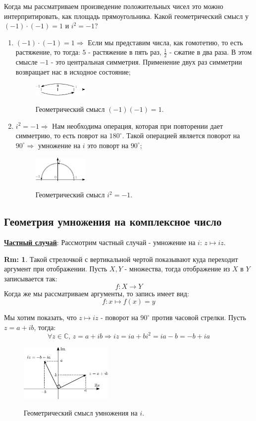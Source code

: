 \documentclass[12pt]{article}
\newcommand{\MC}{\mathbb{C}}
\theoremstyle{definition}
\newtheorem{rem}{Rm:}
\begin{document}
Когда мы рассматриваем произведение положительных чисел это можно интерпритировать, как площадь прямоугольника. Какой геометрический смысл у $(-1){\cdot}(-1) = 1$ и $i^2 = -1$? 
\begin{enumerate}[label=(\arabic*)]
	\item $(-1){\cdot}(-1) = 1 \Rightarrow$ Если мы представим числа, как гомотетию, то есть растяжение, то тогда: $5$ - растяжение в пять раз, $\tfrac{1}{2}$ - сжатие в два раза. В этом смысле $-1$ - это центральная симметрия. Применение двух раз симметрии возвращает нас в исходное состояние;
	\begin{figure}[H]
		\centering
		\includegraphics[width=0.25\textwidth]{AL1S2_6.eps}
		\label{2_6}
		\caption{Геометрический смысл $(-1)(-1) = 1$.}
	\end{figure}
	\item $i^2 = -1 \Rightarrow$ Нам необходима операция, которая при повторении дает симметрию, то есть поврот на $180^\circ$. Такой операцией является поворот на $90^{\circ} \Rightarrow$ умножение на $i$ это поворт на $90^{\circ}$; 
	\begin{figure}[H]
		\centering
		\includegraphics[width=0.25\textwidth]{AL1S2_7.eps}
		\label{2_7}
		\caption{Геометрический смысл $i^2 = -1$.}
	\end{figure}
\end{enumerate}

\subsection*{Геометрия умножения на комплексное число}
\textbf{\uline{Частный случай}}: Рассмотрим частный случай - умножение на $i$: $z \mapsto iz$.
\begin{rem}
	Такой стрелочкой с вертикальной чертой показывают куда переходит аргумент при отображении. Пусть $X, Y$ - множества, тогда отображение из $X$ в $Y$ записывается так: 
	$$
		f \colon X \to Y
	$$ 
	Когда же мы рассматриваем аргументы, то запись имеет вид:
	$$
		f \colon x \mapsto f(x) = y
	$$
\end{rem}
Мы хотим показать, что $z \mapsto iz$ - поворот на $90^{\circ}$ против часовой стрелки. Пусть $z = a + ib$, тогда: $$
	\forall z \in \MC, \, z = a + ib \Rightarrow iz = ia + bi^2 = ia - b = -b + ia
$$
\begin{figure}[H]
	\centering
	\includegraphics[width=0.4\textwidth]{AL1S2_8.eps}
	\label{2_8}
	\caption{Геометрический смысл умножения на $i$.}
\end{figure}
\end{document}
